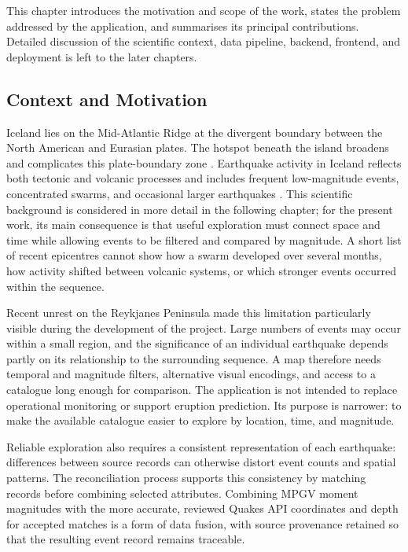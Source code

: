 \documentclass[12pt]{article}
\begin{document}
This chapter introduces the motivation and scope of the work, states the problem addressed by the application, and summarises its principal contributions. Detailed discussion of the scientific context, data pipeline, backend, frontend, and deployment is left to the later chapters.

\subsection*{Context and Motivation}
Iceland lies on the Mid-Atlantic Ridge at the divergent boundary between the North American and Eurasian plates. The hotspot beneath the island broadens and complicates this plate-boundary zone \cite[p.~35]{Einarsson2008}. Earthquake activity in Iceland reflects both tectonic and volcanic processes and includes frequent low-magnitude events, concentrated swarms, and occasional larger earthquakes \cite[pp.~75--79]{Jakobsdottir2008}. This scientific background is considered in more detail in the following chapter; for the present work, its main consequence is that useful exploration must connect space and time while allowing events to be filtered and compared by magnitude. A short list of recent epicentres cannot show how a swarm developed over several months, how activity shifted between volcanic systems, or which stronger events occurred within the sequence.

Recent unrest on the Reykjanes Peninsula made this limitation particularly visible during the development of the project. Large numbers of events may occur within a small region, and the significance of an individual earthquake depends partly on its relationship to the surrounding sequence. A map therefore needs temporal and magnitude filters, alternative visual encodings, and access to a catalogue long enough for comparison. The application is not intended to replace operational monitoring or support eruption prediction. Its purpose is narrower: to make the available catalogue easier to explore by location, time, and magnitude.

Reliable exploration also requires a consistent representation of each earthquake: differences between source records can otherwise distort event counts and spatial patterns. The reconciliation process supports this consistency by matching records before combining selected attributes. Combining MPGV moment magnitudes with the more accurate, reviewed Quakes API coordinates and depth for accepted matches is a form of data fusion, with source provenance retained so that the resulting event record remains traceable.
\end{document}
